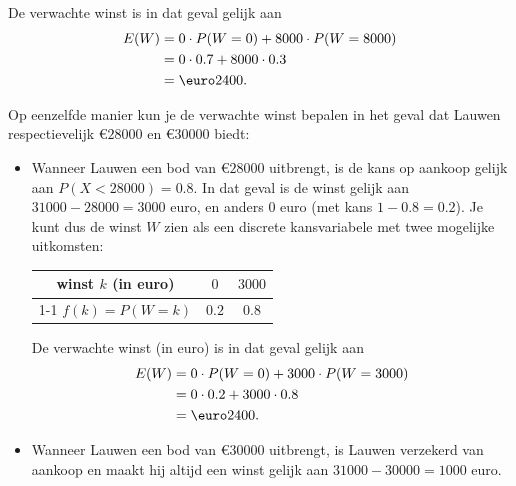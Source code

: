 \begin{enumerate}[label=(\alph*)]
{        De verwachte winst is in dat geval gelijk aan 
        \begin{align*}
            E(W)    &= 0 \cdot P(W=0) + 8 000 \cdot P(W = 8 000) \\
                    &= 0 \cdot 0.7 + 8 000 \cdot 0.3 \\
                    &= \text{\euro} 2 400.
        \end{align*}

        Op eenzelfde manier kun je de verwachte winst bepalen in het geval dat Lauwen respectievelijk \euro $28 000$ en \euro $30 000$ biedt:
        \begin{itemize}
            \item Wanneer Lauwen een bod van \euro $28 000$ uitbrengt, is de kans op aankoop gelijk aan $P(X<28 000) = 0.8$.
            In dat geval is de winst gelijk aan $31 000 - 28 000 = 3 000$ euro, en anders $0$ euro (met kans $1 - 0.8 = 0.2$). 
            Je kunt dus de winst $W$ zien als een discrete kansvariabele met twee mogelijke uitkomsten:
            \begin{center}
                \begin{tabular}{ccc}
                    \toprule
                        {\bfseries winst $k$ (in euro)} & $0$ & $3 000$\\
                    \cmidrule{1-1} \cmidrule{2-2} \cmidrule{3-3}
                        {\bfseries $f(k)=P(W=k)$} & $0.2$ & $0.8$ \\
                    \bottomrule
                \end{tabular}
            \end{center}
            De verwachte winst (in euro) is in dat geval gelijk aan 
            \begin{align*}
                E(W)    &= 0 \cdot P(W=0) + 3 000 \cdot P(W = 3 000) \\
                        &= 0 \cdot 0.2 + 3 000 \cdot 0.8 \\
                        &= \text{\euro} 2 400.
            \end{align*}
            
            \item Wanneer Lauwen een bod van \euro $30 000$ uitbrengt, is Lauwen verzekerd van aankoop en maakt hij altijd een winst gelijk aan $31 000 - 30 000 = 1 000$ euro.
        \end{itemize}
    }


\end{enumerate}
